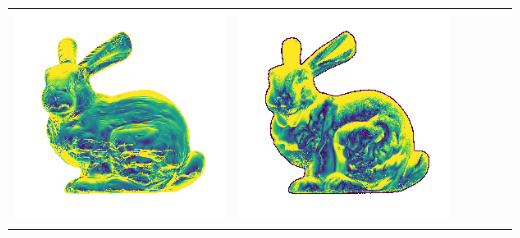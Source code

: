 \begin{tabularx}{\linewidth}{@{}Y@{}Y@{}Y@{}Y@{}Y@{}Y@{}}
\includegraphics[width=\linewidth]{semisynthetic/20150514_14_yu_err.png} &
\includegraphics[width=\linewidth]{semisynthetic/20150514_14_dpsn_err.png} &

\end{tabularx}
